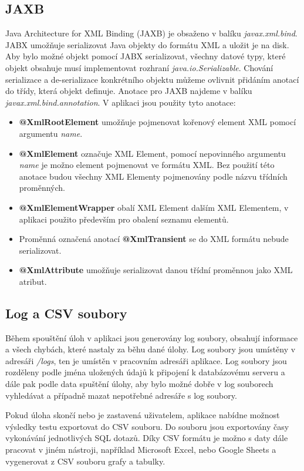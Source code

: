 \documentclass[czech,bachelor,public,dept460,male,cpdeclaration,twoside]{diploma}
\begin{document}
\subsection{JAXB} \label{jabx}
Java Architecture for XML Binding (JAXB) je obsaženo v balíku \textit{javax.xml.bind}. JABX umožňuje serializovat Java objekty do formátu XML a uložit je na disk. Aby bylo možné objekt pomocí JABX serializovat, všechny datové typy, které objekt obsahuje musí implementovat rozhraní \textit{java.io.Serializable}. Chování serializace a de-serializace konkrétního objektu můžeme ovlivnit přidáním anotací do třídy, která objekt definuje. Anotace pro JAXB najdeme v balíku \textit{javax.xml.bind.annotation}. V aplikaci jsou použity tyto anotace:
\begin{itemize}
  	\item \textbf{@XmlRootElement} umožňuje pojmenovat kořenový element XML pomocí argumentu \textit{name}.
  	\item \textbf{@XmlElement} označuje XML Element, pomocí nepovinného argumentu \textit{name} je možno element pojmenovat ve formátu XML. Bez použití této anotace budou všechny XML Elementy pojmenovány podle názvu třídních proměnných.
  	\item \textbf{@XmlElementWrapper} obalí XML Element dalším XML Elementem, v aplikaci použito především pro obalení seznamu elementů.
  	\item Proměnná označená anotací \textbf{@XmlTransient} se do XML formátu nebude serializovat.
  	\item \textbf{@XmlAttribute} umožňuje serializovat danou třídní proměnnou jako XML atribut.
\end{itemize}


\subsection{Log a CSV soubory} \label{logs}
\begin{minipage}{\linewidth}
Během spouštění úloh v aplikaci jsou generovány log soubory, obsahují informace a všech chybách, které nastaly za běhu dané úlohy. Log soubory jsou umístěny v adresáři \textit{/logs}, ten je umístěn v pracovním adresáři aplikace. Log soubory jsou rozděleny podle jména uložených údajů k připojení k databázovému serveru a dále pak podle data spuštění úlohy, aby bylo možné dobře v log souborech vyhledávat a případně mazat nepotřebné adresáře s log soubory.



Pokud úloha skončí nebo je zastavená uživatelem, aplikace nabídne možnost výsledky testu exportovat do CSV souboru. Do souboru jsou exportovány časy vykonávání jednotlivých SQL dotazů. Díky CSV formátu je možno s daty dále pracovat v jiném nástroji, například Microsoft Excel, nebo Google Sheets a vygenerovat z CSV souboru grafy a tabulky.
\end{minipage}
\end{document}
